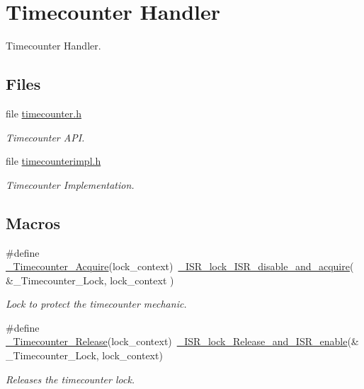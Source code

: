 \hypertarget{group__RTEMSScoreTimecounter}{}\section{Timecounter Handler}
\label{group__RTEMSScoreTimecounter}


Timecounter Handler.  


\subsection*{Files}
\begin{DoxyCompactItemize}
\item 
file \mbox{\hyperlink{score_2timecounter_8h}{timecounter.\+h}}
\begin{DoxyCompactList}\small\item\em Timecounter A\+PI. \end{DoxyCompactList}\item 
file \mbox{\hyperlink{timecounterimpl_8h}{timecounterimpl.\+h}}
\begin{DoxyCompactList}\small\item\em Timecounter Implementation. \end{DoxyCompactList}\end{DoxyCompactItemize}
\subsection*{Macros}
\begin{DoxyCompactItemize}
\item 
\#define \mbox{\hyperlink{group__RTEMSScoreTimecounter_gae15b839246f2681ad7bab1a662b48698}{\+\_\+\+Timecounter\+\_\+\+Acquire}}(lock\+\_\+context)~\mbox{\hyperlink{group__RTEMSScoreISRLocks_gaa4ecfcd40e90531bdd3c348a99b3b7d9}{\+\_\+\+I\+S\+R\+\_\+lock\+\_\+\+I\+S\+R\+\_\+disable\+\_\+and\+\_\+acquire}}( \&\+\_\+\+Timecounter\+\_\+\+Lock, lock\+\_\+context )
\begin{DoxyCompactList}\small\item\em Lock to protect the timecounter mechanic. \end{DoxyCompactList}\item 
\#define \mbox{\hyperlink{group__RTEMSScoreTimecounter_gab0cc9fff94ea04384484711aa6330ebd}{\+\_\+\+Timecounter\+\_\+\+Release}}(lock\+\_\+context)~\mbox{\hyperlink{group__RTEMSScoreISRLocks_ga87a2125e8bfba5f2f5b72adbeee4dcc3}{\+\_\+\+I\+S\+R\+\_\+lock\+\_\+\+Release\+\_\+and\+\_\+\+I\+S\+R\+\_\+enable}}(\&\+\_\+\+Timecounter\+\_\+\+Lock, lock\+\_\+context)
\begin{DoxyCompactList}\small\item\em Releases the timecounter lock. \end{DoxyCompactList}\end{DoxyCompactItemize}
